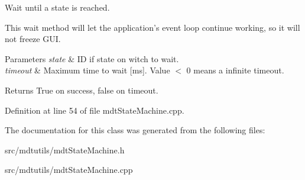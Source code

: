 Wait until a state is reached. 

This wait method will let the application's event loop continue working, so it will not freeze GUI.


\begin{DoxyParams}{Parameters}
{\em state} & ID if state on witch to wait. \\
\hline
{\em timeout} & Maximum time to wait \mbox{[}ms\mbox{]}. Value $<$ 0 means a infinite timeout. \\
\hline
\end{DoxyParams}
\begin{DoxyReturn}{Returns}
True on success, false on timeout. 
\end{DoxyReturn}


Definition at line 54 of file mdtStateMachine.cpp.



The documentation for this class was generated from the following files:\begin{DoxyCompactItemize}
\item 
src/mdtutils/mdtStateMachine.h\item 
src/mdtutils/mdtStateMachine.cpp\end{DoxyCompactItemize}
